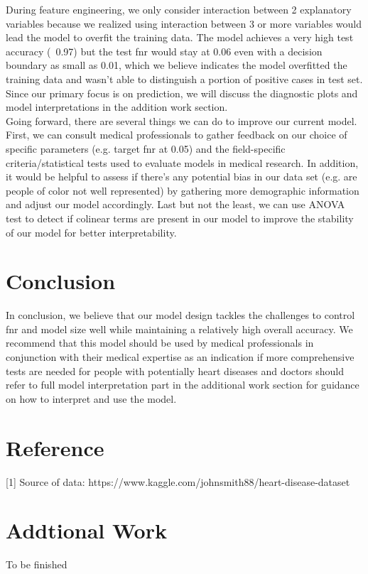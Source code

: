 \documentclass{article}
\begin{document}
During feature engineering, we only consider interaction between 2 explanatory variables because we realized using interaction between 3 or more variables would lead the model to overfit the training data. The model achieves a very high test accuracy (~0.97) but the test fnr would stay at 0.06 even with a decision boundary as small as 0.01, which we believe indicates the model overfitted the training data and wasn't able to distinguish a portion of positive cases in test set. \\

Since our primary focus is on prediction, we will discuss the diagnostic plots and model interpretations in the addition work section. \\


Going forward, there are several things we can do to improve our current model. First, we can consult medical professionals to gather feedback on our choice of specific parameters (e.g. target fnr at 0.05) and the field-specific criteria/statistical tests used to evaluate models in medical research. In addition, it would be helpful to assess if there's any potential bias in our data set (e.g. are people of color not well represented) by gathering more demographic information and adjust our model accordingly. Last but not the least, we can use ANOVA test to detect if colinear terms are present in our model to improve the stability of our model for better interpretability.\\

\section{Conclusion}
In conclusion, we believe that our model design tackles the challenges to control fnr and model size well while maintaining a relatively high overall accuracy. We recommend that this model should be used by medical professionals in conjunction with their medical expertise as an indication if more comprehensive tests are needed for people with potentially heart diseases and doctors should refer to full model interpretation part in the additional work section for guidance on how to interpret and use the model.\\



\section{Reference}
[1] Source of data: https://www.kaggle.com/johnsmith88/heart-disease-dataset \\



\section{Addtional Work}
To be finished\\
\end{document}
